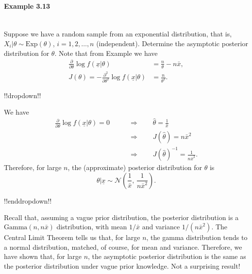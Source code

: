\paragraph{Example 3.13}{~\\
Suppose we have a random sample from an exponential distribution, that is, $X_i|\theta\sim \mathrm{Exp}(\theta)$, $i=1,2,\ldots,n$ (independent). Determine the asymptotic posterior distribution for $\theta$. Note that from Example  we have
\begin{align*}
\frac{\partial}{\partial\theta} \log
f(\underline{x}|\theta)&=\frac{n}{\theta}-n\bar x , \\
J(\theta)=-\frac{\partial^2}{\partial\theta^2} \log
f(\underline{x}|\theta)&=\frac{n}{\theta^2}.
\end{align*}

!!dropdown!!

We have
    \begin{align*}
    \frac{\partial}{\partial\theta} \log f(\underline{x}|\theta)=0
    \quad\quad&\Longrightarrow\quad\quad
    \hat\theta=\frac{1}{\bar x} \\
    &\Longrightarrow\quad\quad
    J(\hat\theta)=n\bar x^2 \\
    &\Longrightarrow\quad\quad
    J(\hat\theta)^{-1}=\frac{1}{n\bar x^2}.
    \end{align*}
    Therefore, for large $n$, the (approximate) posterior distribution for $\theta$ is
    $$
    \theta|\underline{x}\sim \mathcal{N}\left(\frac{1}{\bar x},\,\frac{1}{n\bar x^2}\right).
    $$

!!enddropdown!!

Recall that, assuming a vague prior distribution, the posterior
distribution is a $\mathrm{Gamma}(n,n\bar x)$ distribution, with mean $1/\bar x$
and variance $1/(n\bar x^2)$. The Central Limit Theorem tells us that,
for large $n$, the gamma distribution tends to a normal distribution,
matched, of course, for mean and variance. Therefore, we have shown
that, for large $n$, the asymptotic posterior distribution is the same
as the posterior distribution under vague prior knowledge. Not a
surprising result!}



